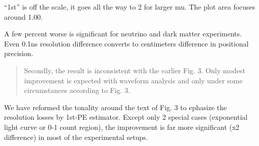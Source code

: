 \documentclass[12pt]{article}
\begin{document}
``1st'' is off the scale, it goes all the way to 2 for larger mu.  The plot area focuses around 1.00.

A few percent worse is significant for neutrino and dark matter experiments.  Even 0.1ns resolution difference converts to centimeters difference in positional precision.

\begin{quote}
Secondly, the result is inconsistent with the earlier Fig. 3. Only modest improvement is expected with waveform analysis and only under some circumstances according to Fig. 3.
\end{quote}

We have reformed the tonality around the text of Fig. 3 to ephasize the resolution losses by 1st-PE estimator.  Except only 2 special cases (exponential light curve or 0-1 count region), the improvement is far more significant (x2 difference) in most of the experimental setups.
\end{document}
